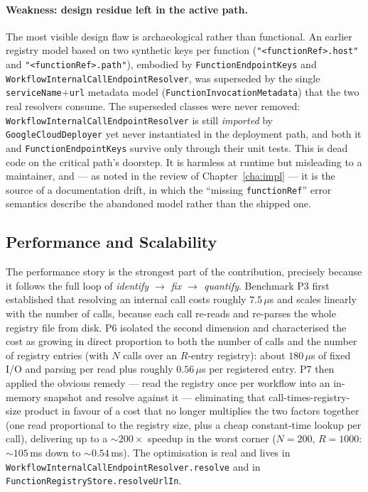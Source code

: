 \paragraph{Weakness: design residue left in the active path.}
The most visible design flaw is archaeological rather than functional. An earlier registry
model based on two synthetic keys per function (\texttt{"<functionRef>.host"} and
\texttt{"<functionRef>.path"}), embodied by \texttt{FunctionEndpointKeys} and
\texttt{WorkflowInternalCallEndpointResolver}, was superseded by the single
\texttt{serviceName}+\texttt{url} metadata model (\texttt{FunctionInvocationMetadata}) that the
two real resolvers consume. The superseded classes were never removed:
\texttt{WorkflowInternalCallEndpointResolver} is still \emph{imported} by
\texttt{GoogleCloudDeployer} yet never instantiated in the deployment path, and both it and
\texttt{FunctionEndpointKeys} survive only through their unit tests. This is dead code on the
critical path's doorstep. It is harmless at runtime but misleading to a maintainer, and --- as
noted in the review of Chapter~\ref{cha:impl} --- it is the source of a documentation drift, in
which the ``missing \texttt{functionRef}'' error semantics describe the abandoned model rather
than the shipped one.

\subsection{Performance and Scalability}

The performance story is the strongest part of the contribution, precisely because it follows
the full loop of \emph{identify $\rightarrow$ fix $\rightarrow$ quantify}. Benchmark P3 first
established that resolving an internal call costs roughly $7.5\,\mu$s and scales
linearly with the number of calls, because each call re-reads and re-parses the whole registry
file from disk. P6 isolated the second dimension and characterised the cost as growing in direct
proportion to both the number of calls and the number of registry entries (with $N$ calls over an
$R$-entry registry): about $180\,\mu$s of fixed I/O and parsing per read plus roughly
$0.56\,\mu$s per registered entry. P7 then applied the obvious remedy --- read the
registry once per workflow into an in-memory snapshot and resolve against it --- eliminating that
call-times-registry-size product in favour of a cost that no longer multiplies the two factors
together (one read proportional to the registry size, plus a cheap constant-time lookup per call),
delivering up to a \(\sim\!200\times\) speedup in the
worst corner ($N{=}200$, $R{=}1000$: \(\sim\!105\)\,ms down to \(\sim\!0.54\)\,ms). The
optimisation is real and lives in \texttt{WorkflowInternalCallEndpointResolver.resolve} and in
\texttt{FunctionRegistryStore.resolveUrlIn}.

